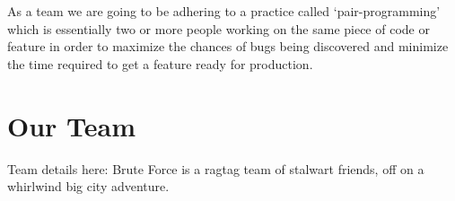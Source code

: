 \documentclass[12pt,a4paper]{article}
\begin{document}
   As a team we are going to be adhering to a practice called `pair-programming' which is essentially two or more people working on the same piece of code or feature in order to maximize the chances of bugs
   being discovered and minimize the time required to get a feature ready for production.

   \section{Our Team}
   Team details here:
   Brute Force is a ragtag team of stalwart friends, off on a whirlwind big city adventure.
\end{document}
